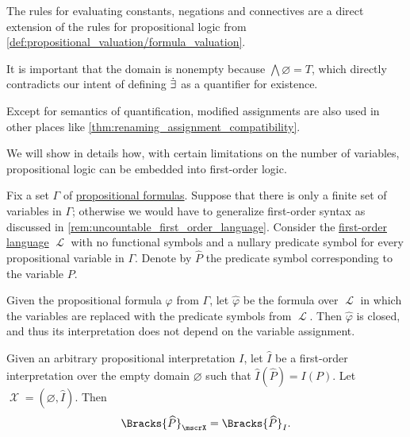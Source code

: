 \begin{comments}
  \item The rules for evaluating constants, negations and connectives are a direct extension of the rules for propositional logic from \cref{def:propositional_valuation/formula_valuation}.

  \item It is important that the domain is nonempty because \( \bigwedge\varnothing = T \), which directly contradicts our intent of defining \( \mathord{\dot{\exists}} \) as a quantifier for existence.

  \item Except for semantics of quantification, modified assignments are also used in other places like \cref{thm:renaming_assignment_compatibility}.
\end{comments}

\begin{remark}\label{rem:propositional_logic_as_first_order_logic}
  We will show in details how, with certain limitations on the number of variables, propositional logic can be embedded into first-order logic.

  Fix a set \( \Gamma \) of \hyperref[def:propositional_syntax/formula]{propositional formulas}. Suppose that there is only a finite set of variables in \( \Gamma \); otherwise we would have to generalize first-order syntax as discussed in \cref{rem:uncountable_first_order_language}. Consider the \hyperref[def:first_order_language]{first-order language} \( \mscrL \) with no functional symbols and a nullary predicate symbol for every propositional variable in \( \Gamma \). Denote by \( \widehat{P} \) the predicate symbol corresponding to the variable \( P \).

  Given the propositional formula \( \varphi \) from \( \Gamma \), let \( \widehat \varphi \) be the formula over \( \mscrL \) in which the variables are replaced with the predicate symbols from \( \mscrL \). Then \( \widehat \varphi \) is closed, and thus its interpretation does not depend on the variable assignment.

  Given an arbitrary propositional interpretation \( I \), let \( \widehat{I} \) be a first-order interpretation over the empty domain \( \varnothing \) such that \( \widehat{I}(\widehat{P}) = I(P) \). Let \( \mscrX = (\varnothing, \widehat{I}) \). Then
  \begin{equation*}
    \Bracks{\widehat{P}}_\mscrX = \Bracks{\widehat{P}}_I.
  \end{equation*}
\end{remark}

